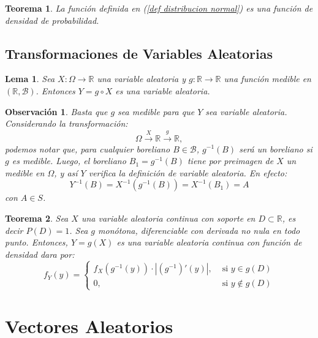 \documentclass{report}
\newtheorem{thm}{Teorema}[section]
\newtheorem{lem}{Lema}[section]
\newtheorem{obs}{Observación}[section]
\begin{document}
\begin{thm}
La función definida en (\ref{def distribucion normal}) es una función de densidad de probabilidad.
\end{thm}


\subsection{Transformaciones de Variables Aleatorias}

\begin{lem}
    Sea $X:\Omega\rightarrow \mathbb{R}$ una variable aleatoria y $g:\mathbb{R}\rightarrow\mathbb{R}$ una función medible en $(\mathbb{R},\mathcal{B})$.
    Entonces $Y = g\circ X$ es una variable aleatoria.
\end{lem}

\begin{obs}
    Basta que $g$ sea medible para que $Y$ sea variable aleatoria. Considerando la transformación:
    \begin{equation*}
        \Omega \xrightarrow{X} \mathbb{R} \xrightarrow{g} \mathbb{R},
    \end{equation*}
    podemos notar que, para cualquier boreliano $B\in\mathcal{B}$, $g^{-1}(B)$ será un boreliano si $g$ es medible.
    Luego, el boreliano $B_1 = g^{-1}(B)$ tiene por preimagen de $X$ un medible en $\Omega$, y así $Y$ verifica la definición de variable aleatoria.
    En efecto:
    \begin{equation*}
        Y^{-1}(B) = X^{-1}(g^{-1}(B)) = X^{-1}(B_1) = A
    \end{equation*}
    con $A\in S$.
\end{obs}

\begin{thm}
    Sea $X$ una variable aleatoria continua con soporte en $D\subset\mathbb{R}$, es decir $P(D)=1$. Sea $g$ monótona, diferenciable con derivada no nula en 
    todo punto. Entonces, $Y=g(X)$ es una variable aleatoria continua con función de densidad dara por:
    \begin{equation*}
        f_Y(y)=\begin{cases}
            f_X(g^{-1}(y)) \cdot |(g^{-1})'(y)|, &\text{ si } y\in g(D)\\
            0, & \text{ si } y\notin g(D)
        \end{cases}
    \end{equation*}
\end{thm}

\section{Vectores Aleatorios}
\end{document}
